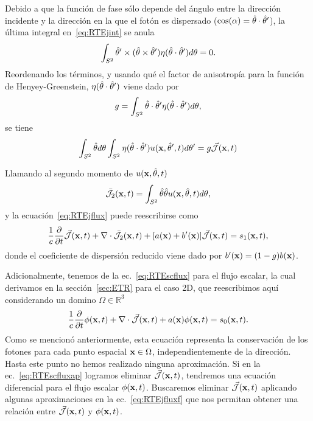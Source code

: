 Debido a que la función de fase sólo depende del ángulo entre 
la dirección incidente y la dirección en la que el fotón es dispersado ($\cos(\alpha)=\hat{\theta} \cdot \hat{\theta}'$), la última integral en~\eqref{eq:RTEjint} se anula
\begin{equation}
\begin{split}
\begin{aligned}
\int_{S^2}  \hat{\theta}' \times(\hat{\theta} \times \hat{\theta}') \eta(\hat{\theta} \cdot \hat{\theta}') d\theta =0.
\end{aligned}
\end{split}
\label{eq:RTEjint2}
\end{equation}
Reordenando los términos, y usando qué
el factor de anisotropía para la función de Henyey-Greenstein, $\eta(\hat{\theta} \cdot \hat{\theta}')$ viene dado por 
\begin{equation}
g=\int_{S^2} \hat{\theta} \cdot \hat{\theta}' \eta(\hat{\theta} \cdot \hat{\theta}') d\theta,
\label{eq:gnorm}
\end{equation}
se tiene 
\begin{equation}
\begin{split}
\begin{aligned}
\int_{S^2} \hat{\theta} d\theta \int_{S^2} \eta(\hat{\theta} \cdot \hat{\theta}')  u(\mathbf{x},\hat{\theta}',t) d\theta' 
=g \vec{ \mathcal{J}}(\mathbf{x},t)
\end{aligned}
\end{split}
\label{eq:RTEjint3}
\end{equation}

Llamando al segundo momento de $u(\mathbf{x},\hat{\theta},t)$
\begin{equation}
\bar{\mathcal{J}}_2(\mathbf{x},t)=\int_{S^2} \hat{\theta} \hat{\theta} u(\mathbf{x},\hat{\theta},t) d\theta,
\label{eq:RTEjflux2}
\end{equation}
y la ecuación~\eqref{eq:RTEjflux} puede reescribirse como
\begin{equation}
\begin{split}
\begin{aligned}
\frac{1}{c}\frac{\partial}{\partial t} \vec{ \mathcal{J}}(\mathbf{x},t)+\nabla \cdot \bar{\mathcal{J}}_2(\mathbf{x},t)+[a(\mathbf{x})+b'(\mathbf{x})]\vec{ \mathcal{J}}(\mathbf{x},t)=s_1(\mathbf{x},t),
\end{aligned}
\end{split}
\label{eq:RTEjfluxf}
\end{equation}
donde el coeficiente de dispersión reducido viene dado por $b'(\mathbf{x})=(1-g)b(\mathbf{x})$.

Adicionalmente, tenemos de la ec.~\eqref{eq:RTEscflux} para el flujo escalar, la cual derivamos en la 
sección~\ref{sec:ETR} para el caso 2D, que reescribimos aquí considerando un domino $\Omega \in \mathbb{R}^3$
\begin{equation}
\frac{1}{c}\frac{\partial}{\partial t} \phi(\mathbf{x},t)+\nabla \cdot \vec{ \mathcal{J}}(\mathbf{x},t)
+a(\mathbf{x})\phi(\mathbf{x},t)=s_0(\mathbf{x},t).
\label{eq:RTEscfluxap}
\end{equation}
Como se mencionó anteriormente, esta ecuación representa la conservación 
de los fotones para cada punto espacial $\mathbf{x} \in \Omega$, independientemente 
de la dirección. Hasta este punto no hemos realizado ninguna aproximación. 
Si en la ec.~\eqref{eq:RTEscfluxap} logramos eliminar $\vec{ \mathcal{J}}(\mathbf{x},t)$, tendremos una ecuación diferencial 
para el flujo escalar $\phi(\mathbf{x},t)$. Buscaremos eliminar $\vec{ \mathcal{J}}(\mathbf{x},t)$ aplicando algunas aproximaciones en la ec.~\eqref{eq:RTEjfluxf} que nos permitan obtener una relación entre $\vec{ \mathcal{J}}(\mathbf{x},t)$ y $\phi(\mathbf{x},t)$.

